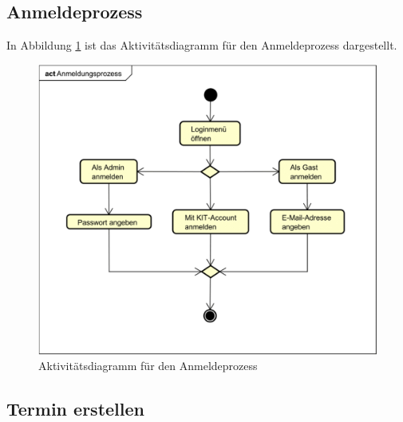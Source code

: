 \subsection{Anmeldeprozess}

In Abbildung \ref{fig:activity_diagram_login} ist das Aktivitätsdiagramm für den Anmeldeprozess dargestellt.
\begin{figure}[ht]
    \centering
    \includegraphics[width=\textwidth]{figures/activitydiagrams/anmeldeprozess}
    \caption{Aktivitätsdiagramm für den Anmeldeprozess}
    \label{fig:activity_diagram_login}
\end{figure}
\clearpage
\subsection{Termin erstellen}

